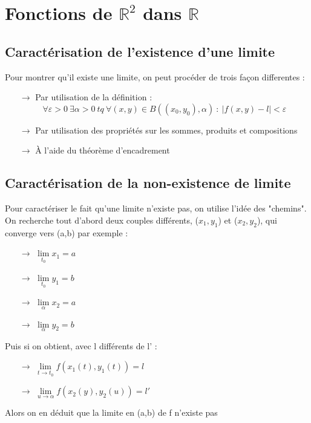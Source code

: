 \chapter{Fonctions de $\mathbb{R}^2$ dans $\mathbb{R}$}
\section{Caractérisation de l'existence d'une limite}
Pour montrer qu'il existe une limite, on peut procéder de trois façon differentes : 
\begin{itemize}
 \item[$\rightarrow$] Par utilisation de la définition : $$\forall \varepsilon > 0~ \exists \alpha > 0~ tq~ \forall (x,y)\in B((x_0,y_0),\alpha)~ :~ |f(x,y) -l| < \varepsilon$$
 \item[$\rightarrow$] Par utilisation des propriétés sur les sommes, produits et compositions
 \item[$\rightarrow$] À l'aide du théorème d'encadrement
\end{itemize}
\section{Caractérisation de la non-existence de limite}
Pour caractériser le fait qu'une limite n'existe pas, on utilise l'idée des "chemins".\\
On recherche tout d'abord deux couples différents, ($x_1,y_1$) et ($x_2,y_2$), qui converge vers (a,b) par exemple :  
\begin{itemize}
 \item[$\rightarrow$] $\underset{t_0}\lim x_1 = a$ 
 \item[$\rightarrow$] $\underset{t_0}\lim y_1 = b$ 
 \item[$\rightarrow$] $\underset{\alpha}\lim x_2 = a$ 
 \item[$\rightarrow$] $\underset{\alpha}\lim y_2 = b$ 
\end{itemize}
Puis si on obtient, avec l différents de l' :
\begin{itemize}
 \item[$\rightarrow$] $\underset{t \rightarrow t_0}\lim f(x_1(t),y_1(t)) = l$
 \item[$\rightarrow$] $\underset{u \rightarrow \alpha}\lim f(x_2(y),y_2(u)) = l'$
\end{itemize}
Alors on en déduit que la limite en (a,b) de f n'existe pas